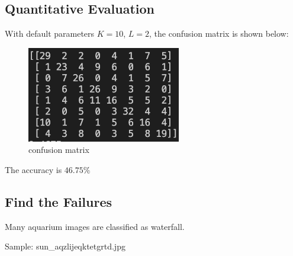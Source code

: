 \documentclass[11pt]{article} \usepackage{fullpage} \usepackage{graphicx} \usepackage{epstopdf} \usepackage{color} \usepackage{psfrag} \usepackage{pdfsync}\usepackage{indentfirst}\usepackage{subfigure}\usepackage{float}\usepackage[section]{placeins}
\begin{document}
\subsection{Quantitative Evaluation}

With default parameters $K = 10$, $L = 2$, the confusion matrix is shown below:

\begin{figure}[H]
\centering
\includegraphics[width=0.6\textwidth]{results/default_mat.png}
\caption{confusion matrix}
\end{figure}

The accuracy is $46.75\%$

\setcounter{subsection}{5}
\subsection{Find the Failures}

Many aquarium images are classified as waterfall.

Sample: sun\_aqzlijeqktetgrtd.jpg

\begin{figure}[H]
\centering
{}
\end{figure}
\end{document}

